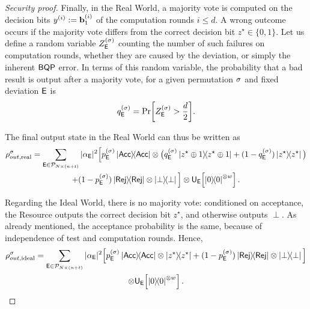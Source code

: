 \begin{proof}[Security proof]
    Finally, in the Real World, a majority vote is computed on the decision bits
    $y^{(i)} := \mathbf b^{(i)}_1$ of the computation rounds $i \le d$.
    A wrong outcome occurs if the majority vote differs from the correct decision
    bit $z^\star \in \{0,1\}$.
    Let us define a random variable $Z^{(\sigma)}_{\mathsf{E}}$ counting the number of such failures on computation rounds, whether they are caused by the deviation, or simply the inherent $\textsf{BQP}$ error.
    In terms of this random variable, the probability that a bad result is output after a majority vote, for a given permutation $\sigma$ and fixed deviation $\mathsf{E}$ is
    \begin{equation}
        q^{(\sigma)}_{\mathsf{E}}
        =
        \Pr[Z^{(\sigma)}_{\mathsf{E}} > \frac d 2].
    \end{equation}

    The final output state in the Real World can thus be written as
    \begin{multline}
        \rho^{\sigma}_{out,\mathrm{real}}
        =
        \sum_{\mathsf{E}\in\mathcal{P}_{N\times(n+t)}}
        |\alpha_{\mathsf{E}}|^2
        \Big[
            p^{(\sigma)}_{\mathsf{E}}\ketbra{\mathsf{Acc}}
            \otimes
            \big(
                q^{(\sigma)}_{\mathsf{E}}\ketbra{z^\star\oplus 1}
                +
                (1-q^{(\sigma)}_{\mathsf{E}})\ketbra{z^\star}
            \big)
        \\
        +
            (1-p^{(\sigma)}_{\mathsf{E}})
            \ketbra{\mathsf{Rej}}\otimes\ketbra{\perp}
        \Big]
        \otimes
        \mathsf{U}_{\mathsf{E}}\!\left[
            \ketbra0^{\otimes w}
        \right].
    \end{multline}

    Regarding the Ideal World, there is no majority vote: conditioned on acceptance, the Resource outputs the correct decision bit $z^\star$, and otherwise outputs
    $\perp$. As already mentioned, the acceptance probability is the same, because of independence of test and computation rounds.
    Hence,
    \begin{multline}
        \rho^{\sigma}_{out,\mathrm{ideal}}
        =
        \sum_{\mathsf{E}\in\mathcal{P}_{N\times(n+t)}}
        |\alpha_{\mathsf{E}}|^2
        \Big[
            p^{(\sigma)}_{\mathsf{E}}\ketbra{\mathsf{Acc}}\otimes\ketbra{z^\star}
            +
            (1-p^{(\sigma)}_{\mathsf{E}})
            \ketbra{\mathsf{Rej}}\otimes\ketbra{\perp}
        \Big]
        \\
        \otimes
        \mathsf{U}_{\mathsf{E}}\!\left[
            \ketbra0^{\otimes w}
        \right].
    \end{multline}


\end{proof}
